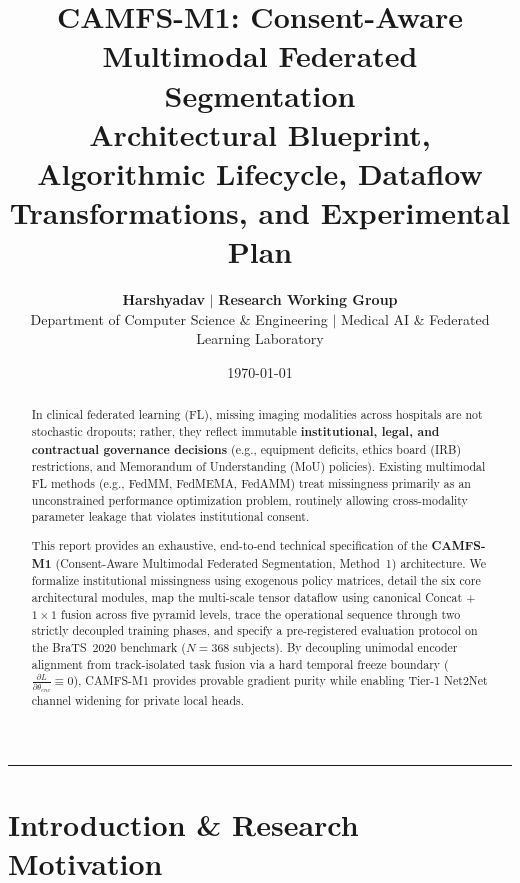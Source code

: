 \documentclass[10pt,a4paper]{article}
\title{\vspace{-1.2cm}
    \textbf{\Large CAMFS-M1: Consent-Aware Multimodal Federated Segmentation}\\
    \large Architectural Blueprint, Algorithmic Lifecycle, Dataflow Transformations, and Experimental Plan
}
\author{
    \textbf{Harshyadav} \quad $\vert$ \quad \textbf{Research Working Group} \\
    \small Department of Computer Science \& Engineering $\vert$ Medical AI \& Federated Learning Laboratory
}
\date{\small \today}
\begin{document}
\maketitle

\begin{abstract}
\noindent In clinical federated learning (FL), missing imaging modalities across hospitals are not stochastic dropouts; rather, they reflect immutable \textbf{institutional, legal, and contractual governance decisions} (e.g., equipment deficits, ethics board (IRB) restrictions, and Memorandum of Understanding (MoU) policies). Existing multimodal FL methods (e.g., FedMM, FedMEMA, FedAMM) treat missingness primarily as an unconstrained performance optimization problem, routinely allowing cross-modality parameter leakage that violates institutional consent. 

This report provides an exhaustive, end-to-end technical specification of the \textbf{CAMFS-M1} (Consent-Aware Multimodal Federated Segmentation, Method~1) architecture. We formalize institutional missingness using exogenous policy matrices, detail the six core architectural modules, map the multi-scale tensor dataflow using canonical Concat + $1\times 1$ fusion across five pyramid levels, trace the operational sequence through two strictly decoupled training phases, and specify a pre-registered evaluation protocol on the BraTS~2020 benchmark ($N = 368$ subjects). By decoupling unimodal encoder alignment from track-isolated task fusion via a hard temporal freeze boundary ($\frac{\partial L}{\partial \theta_{enc}} \equiv 0$), CAMFS-M1 provides provable gradient purity while enabling Tier-1 Net2Net channel widening for private local heads.
\end{abstract}

\vspace{1mm}
\hrule
\vspace{3mm}

\section{Introduction \& Research Motivation}
\end{document}
